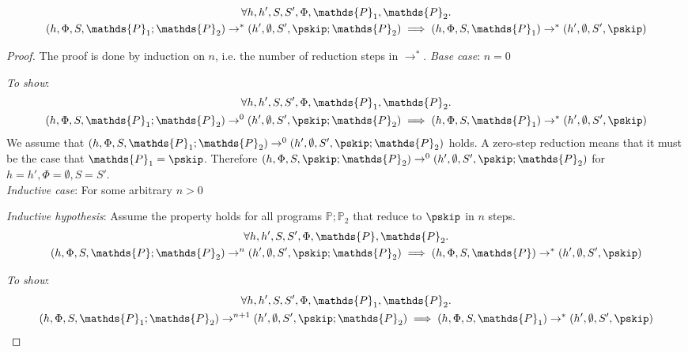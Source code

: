 \begin{lem}
	\label{ref:2seq}
	\begin{gather*}
		\forall h, h', S, S', \Phi, \mathds{P}_1, \mathds{P}_2 \ldotp \\
		(h, \Phi, S, \mathds{P}_1; \mathds{P}_2) \rightarrow^* (h', \emptyset, S', \pskip; \mathds{P}_2)
		\implies
		(h, \Phi, S, \mathds{P}_1) \rightarrow^* (h', \emptyset, S', \pskip)
	\end{gather*}
	
	{\parindent0pt
	\begin{proof}
	The proof is done by induction on $n$, i.e. the number of reduction steps in $\rightarrow^*$.
	\indline
	\textit{Base case}: $n = 0$
	
	\textit{To show}:
	\begin{gather*}
		\forall h, h', S, S', \Phi, \mathds{P}_1, \mathds{P}_2 \ldotp \\
		(h, \Phi, S, \mathds{P}_1; \mathds{P}_2) \rightarrow^0 (h', \emptyset, S', \pskip; \mathds{P}_2)
		\implies
		(h, \Phi, S, \mathds{P}_1) \rightarrow^* (h', \emptyset, S', \pskip)
	\end{gather*}
	We assume that $(h, \Phi, S, \mathds{P}_1; \mathds{P}_2) \rightarrow^0 (h', \emptyset, S', \pskip; \mathds{P}_2)$ holds. A zero-step reduction means that it must be the case that $\mathds{P}_1 = \pskip$. Therefore $(h, \Phi, S, \pskip; \mathds{P}_2) \rightarrow^0 (h', \emptyset, S', \pskip; \mathds{P}_2)$ for $h = h', \Phi = \emptyset, S = S'$. \\
	\indline
	\textit{Inductive case}: For some arbitrary $n > 0$
	
	\textit{Inductive hypothesis}: Assume the property holds for all programs $\mathds{P}; \mathds{P}_2$ that reduce to $\pskip$ in $n$ steps.
	\begin{gather*}
		\forall h, h', S, S', \Phi, \mathds{P}, \mathds{P}_2 \ldotp \\ 
		(h, \Phi, S, \mathds{P}; \mathds{P}_2) \rightarrow^n (h', \emptyset, S', \pskip; \mathds{P}_2)
		\implies
		(h, \Phi, S, \mathds{P}) \rightarrow^* (h', \emptyset, S', \pskip)
	\end{gather*}
	
	\textit{To show}:
	\begin{gather*}
		\forall h, h', S, S', \Phi, \mathds{P}_1, \mathds{P}_2 \ldotp \\
		(h, \Phi, S, \mathds{P}_1; \mathds{P}_2) \rightarrow^{n+1} (h', \emptyset, S', \pskip; \mathds{P}_2)
		\implies
		(h, \Phi, S, \mathds{P}_1) \rightarrow^* (h', \emptyset, S', \pskip)
	\end{gather*}
	

\end{proof}}
\end{lem}
